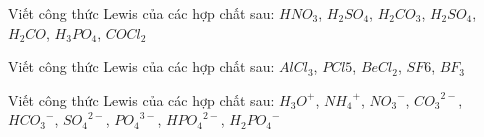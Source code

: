 \documentclass[Main_ver2.tex]{subfiles}
\begin{document}
	\begin{vd}
		Viết công thức Lewis của các hợp chất sau: $HNO_3$, $H_2SO_4$, $H_2CO_3$, $H_2SO_4$, $H_2CO$, $H_3PO_4$, $COCl_2$
		\loigiai{}
	\end{vd}
	\begin{vd}
		Viết công thức Lewis của các hợp chất sau: $AlCl_3$, $PCl5$, $BeCl_2$,  $SF6$, $BF_3$
		\loigiai{}
	\end{vd}
	\begin{vd}
		Viết công thức Lewis của các hợp chất sau: ${H_3O}^+$, ${NH_4}^{+}$, ${NO_3}^-$, ${CO_3}^{2-}$, ${HCO_3}^{-}$, ${SO_4}^{2-}$, ${PO_4}^{3-}$, ${HPO_4}^{2-}$, ${H_2PO_4}^{-}$
		\loigiai{}
	\end{vd}
\end{document}
